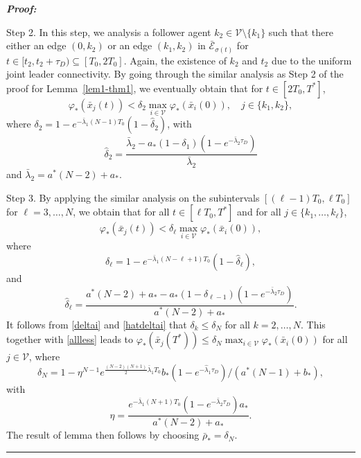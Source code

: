 \documentclass[a4paper, 11pt]{article}
\newenvironment{IEEEproof}[1][\bf Proof]{\smallskip\par\noindent\textit{#1: }}{\hspace*{\fill} \rule{6pt}{6pt}\smallskip}
\begin{document}
\begin{IEEEproof}
\vspace*{2mm}

\noindent Step 2. In this step, we analysis a follower agent $k_2 \in \mathcal{V} \setminus \{k_1\}$ such that
there either an edge $(0,k_2)$ or an edge $(k_1,k_2)$ in $\bar{\mathcal{E}}_{\sigma(t)}$ for $t \in [t_2,t_2+\tau_D) \subseteq [T_0, 2T_0]$. Again, the existence of $k_2$ and $t_2$ due to the uniform joint leader connectivity.
By going through the similar analysis as Step 2 of the proof for Lemma~\ref{lem1-thm1}, we eventually obtain
that for $t \in [2T_0, T^*]$,
\begin{equation*}
\varphi_*(\bar{x}_{j}(t)) < \delta_2 \max_{i \in \mathcal{V}}\varphi_*(\bar{x}_{i}(0)), \quad j \in \{k_1, k_2\},
\end{equation*}
where $\delta_2=1-e^{-\bar{\lambda}_1 (N-1)T_0}(1-\hat{\delta}_2)$,
with
\begin{equation*}\label{hatdelta2}
\hat{\delta}_2= \frac{\bar{\lambda}_2-a_*(1-\delta_1) (1-e^{-\bar{\lambda}_2 \tau_D})}{\bar{\lambda}_2}
\end{equation*}
and $\bar{\lambda}_2=a^* (N-2)+a_*$.

\vspace*{2mm}

\noindent Step 3. By applying the similar analysis on the subintervals $[(\ell-1)T_0,\ell T_0]$ for $\ell=3, \ldots, N$,
we obtain that for all $t \in [\ell T_0, T^*]$ and for all $j \in \{k_1, \ldots, k_\ell \}$,
\begin{equation} \label{allless}
\varphi_*(\bar{x}_{j}(t))  < \delta_\ell \max_{i \in \mathcal{V}}\varphi_*(\bar{x}_i(0)),
\end{equation}
where
\begin{equation}\label{deltai}
\delta_\ell=1-e^{-\bar{\lambda}_1(N-\ell+1)T_0}(1-\hat{\delta}_\ell),
\end{equation}
and
\begin{equation}\label{hatdeltai}
\hat{\delta}_\ell= \frac{a^*(N-2)+a_*-a_*(1-\delta_{\ell-1}) (1-e^{-\bar{\lambda}_2 \tau_D})}{a^*(N-2)+a_*}.
\end{equation}
It follows from \eqref{deltai} and \eqref{hatdeltai} that $\delta_{k} \leq \delta_{N}$ for all $k=2,\ldots,N$.
This together with \eqref{allless} leads to
$\varphi_*(\bar{x}_{j}(T^*)) \leq \delta_N \max_{i \in \mathcal{V}}\varphi_*(\bar{x}_i(0))$ for all $j \in \mathcal{V}$, where
\begin{equation}\label{deltaN}
\delta_N=1-\eta^{N-1}e^{\frac{(N-2)(N+1)}{2}\bar{\lambda}_1 T_0}b_*(1-e^{-\hat{\lambda}_1 \tau_D})/({a^*(N-1)+b_*}),
\end{equation}
with
\[
\eta=\frac{e^{-\bar{\lambda}_1(N+1)T_0}(1-e^{-\bar{\lambda}_2\tau_D})a_*  }{a^*(N-2)+a_*}.
\]
The result of lemma then follows by choosing $\bar{\rho}_*=\delta_{N}$.
\end{IEEEproof}
\end{document}
